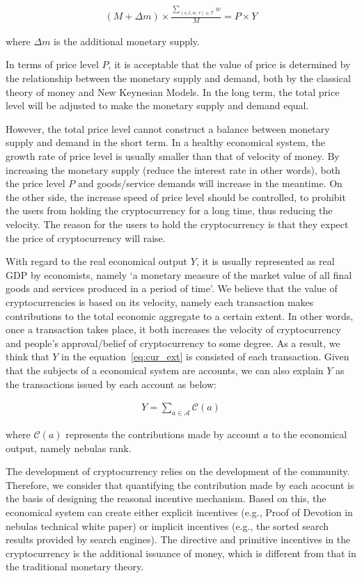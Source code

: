 \begin{align}
(M + \Delta{m}) \times \frac{\sum_{(s, t, w, \tau)\in \mathcal{T}}{w}}{M} = P \times Y
\label{eq:cur_ext}
\end{align}

\noindent where $\Delta{m}$ is the additional monetary supply. 

In terms of price level $P$, it is acceptable that the value of price is determined by the relationship between the monetary supply and demand, both by the classical theory of money and New Keynesian Models. In the long term, the total price level will be adjusted to make the monetary supply and demand equal.

However, the total price level cannot construct a balance between monetary supply and demand in the short term. In a healthy economical system, the growth rate of price level is usually smaller than that of velocity of money. By increasing the monetary supply (reduce the interest rate in other words), both the price level $P$ and goods/service demands will increase in the meantime. On the other side, the increase speed of price level should be controlled, to prohibit the users from holding the cryptocurrency for a long time, thus reducing the velocity. The reason for the users to hold the cryptocurrency is that they expect the price of cryptocurrency will raise.


With regard to the real economical output $Y$, it is usually represented as real GDP by economists, namely `a monetary measure of the market value of all final goods and services produced in a period of time'. We believe that the value of cryptocurrencies is based on its velocity, namely each transaction makes contributions to the total economic aggregate to a certain extent. In other words, once a transaction takes place, it both increases the velocity of cryptocurrency and people's approval/belief of cryptocurrency to some degree. As a result, we think that $Y$ in the equation~\ref{eq:cur_ext} is consisted of each transaction. Given that the subjects of a economical system are accounts, we can also explain $Y$ as the transactions issued by each account as below:

\begin{align}
Y=\sum_{a\in \mathcal{A}} \mathcal{C}(a)
\end{align}

\noindent where $\mathcal{C}(a)$ represents the contributions made by account $a$ to the economical output, namely nebulas rank.

The development of cryptocurrency relies on the development of the community. Therefore, we consider that quantifying the contribution made by each acocunt is the basis of designing the reasonal incentive mechanism. Based on this, the economical system can create either explicit incentives (e.g., Proof of Devotion in nebulas technical white paper) or implicit incentives (e.g., the sorted search results provided by search engines). 
The directive and primitive incentives in the cryptocurrency is the additional issuance of money, which is different from that in the traditional monetary theory.